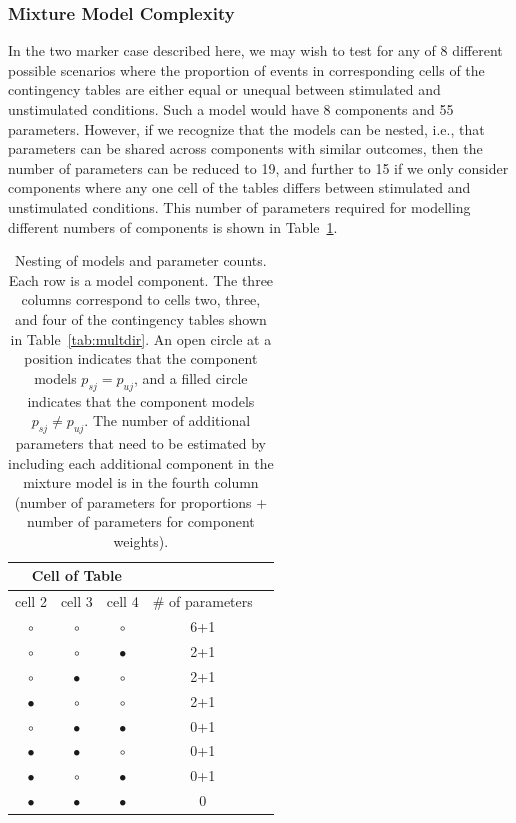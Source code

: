 \documentclass[11pt]{article}
\begin{document}
\subsubsection*{Mixture Model Complexity}
In the two marker case described here, we may wish to test for any of 8 different possible scenarios where the proportion of events in corresponding cells of the contingency tables are either equal or unequal between stimulated and unstimulated conditions. Such a model would have 8 components and 55 parameters. However, if we recognize that the models can be nested, i.e., that parameters can be shared across components with similar outcomes, then the number of parameters can be reduced to 19, and further to 15 if we only consider components where any one cell of the tables differs between stimulated and unstimulated conditions. This number of parameters required for modelling different numbers of components is shown in Table~\ref{tab:nesting}.
\begin{table}
\centering
\parbox{0.8\linewidth}{\caption{Nesting of models and parameter counts. Each row is a model component. The three columns correspond to cells two, three, and four of the contingency tables shown in Table~\ref{tab:multdir}. An open circle at a position indicates that the component models $p_{sj}=p_{uj}$, and a filled circle indicates that the component models $p_{sj}\ne p_{uj}$. The number of additional parameters that need to be estimated by including each additional component in the mixture model is in the fourth column (number of parameters for proportions + number of parameters for component weights).}\label{tab:nesting}
\centering
\begin{tabular}{ccccc}
\multicolumn{3}{c}{Cell of Table}\\
\hline
cell 2&cell 3&cell 4&\# of parameters\\
\hline
$\circ$&$\circ$&$\circ$&6+1\\
$\circ$&$\circ$&$\bullet$&2+1\\
$\circ$&$\bullet$&$\circ$&2+1\\
$\bullet$&$\circ$&$\circ$&2+1\\
$\circ$&$\bullet$&$\bullet$&0+1\\
$\bullet$&$\bullet$&$\circ$&0+1\\
$\bullet$&$\circ$&$\bullet$&0+1\\
$\bullet$&$\bullet$&$\bullet$&0\\
\end{tabular}
}
\end{table}
\end{document}
